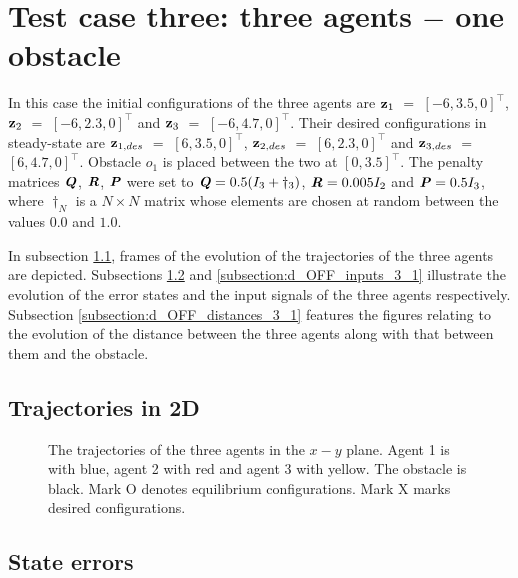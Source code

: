 \section{Test case three: three agents $-$ one obstacle}

In this case the initial configurations of the three agents are
$\bm{\mathbf{z}}_1$ $=$ $[-6, 3.5, 0]^{\top}$,
$\bm{\mathbf{z}}_2$ $=$ $[-6, 2.3, 0]^{\top}$ and
$\bm{\mathbf{z}}_3$ $=$ $[-6, 4.7, 0]^{\top}$.
Their desired configurations in steady-state are
$\bm{\mathbf{z}}_{1,des}$ $=$ $[6, 3.5, 0]^{\top}$,
$\bm{\mathbf{z}}_{2,des}$ $=$ $[6, 2.3, 0]^{\top}$ and
$\bm{\mathbf{z}}_{3,des}$ $=$ $[6, 4.7, 0]^{\top}$.
Obstacle $o_1$ is placed between the two at $[0, 3.5]^{\top}$. The penalty
matrices $\bm{\mathit{Q}}$, $\bm{\mathit{R}}$, $\bm{\mathit{P}}$ were set to
$\bm{\mathit{Q}} = 0.5 (I_3 + \dagger_3)$, $\bm{\mathit{R}} = 0.005 I_2$ and
$\bm{\mathit{P}} = 0.5 I_3$, where $\dagger_N$ is a $N \times N$ matrix whose
elements are chosen at random between the values $0.0$ and $1.0$.

In subsection \ref{subsection:d_OFF_trajectories_3_1}, frames of the evolution of the
trajectories of the three agents are depicted. Subsections
\ref{subsection:d_OFF_errors_3_1} and \ref{subsection:d_OFF_inputs_3_1} illustrate
the evolution of the error states and the input signals of the three agents
respectively. Subsection \ref{subsection:d_OFF_distances_3_1} features the
figures relating to the evolution of the distance between the three agents
along with that between them and the obstacle.


\subsection{Trajectories in 2D}
\label{subsection:d_OFF_trajectories_3_1}

\begin{figure}[H]
  \scalebox{0.9}{}
  \caption{The trajectories of the three agents in the $x-y$ plane. Agent 1 is with
    blue, agent 2 with red and agent 3 with yellow. The obstacle is black.
    Mark O denotes equilibrium configurations. Mark X marks desired configurations.}
  \label{fig:d_OFF_trajectory_3_1}
\end{figure}


\subsection{State errors}
\label{subsection:d_OFF_errors_3_1}

